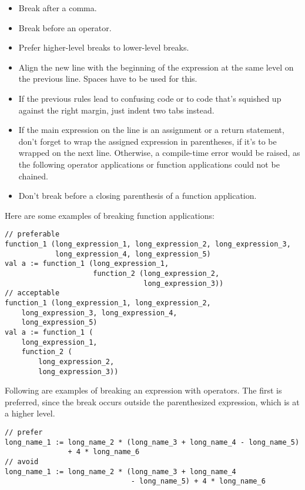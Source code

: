 \begin{itemize}
\item Break after a comma. 
\item Break before an operator. 
\item Prefer higher-level breaks to lower-level breaks. 
\item Align the new line with the beginning of the expression at the same level on the previous line. Spaces have to be used for this. 
\item If the previous rules lead to confusing code or to code that's squished up against the right margin, just indent two tabs instead. 
\item If the main expression on the line is an assignment or a return statement, don't forget to wrap the assigned expression in parentheses, if it's to be wrapped on the next line. Otherwise, a compile-time error would be raised, as the following operator applications or function applications could not be chained. 
\item Don't break before a closing parenthesis of a function application.  
\end{itemize}

\example Here are some examples of breaking function applications: 

\begin{lstlisting}
// preferable
function_1 (long_expression_1, long_expression_2, long_expression_3,
            long_expression_4, long_expression_5)
val a := function_1 (long_expression_1,
                     function_2 (long_expression_2,
                                 long_expression_3))
// acceptable
function_1 (long_expression_1, long_expression_2, 
    long_expression_3, long_expression_4, 
    long_expression_5)
val a := function_1 (
    long_expression_1,
    function_2 (
        long_expression_2,
        long_expression_3))
\end{lstlisting}

\example Following are examples of breaking an expression with operators. The first is preferred, since the break occurs outside the parenthesized expression, which is at a higher level. 

\begin{lstlisting}
// prefer
long_name_1 := long_name_2 * (long_name_3 + long_name_4 - long_name_5)
               + 4 * long_name_6
// avoid
long_name_1 := long_name_2 * (long_name_3 + long_name_4 
                              - long_name_5) + 4 * long_name_6
\end{lstlisting}

